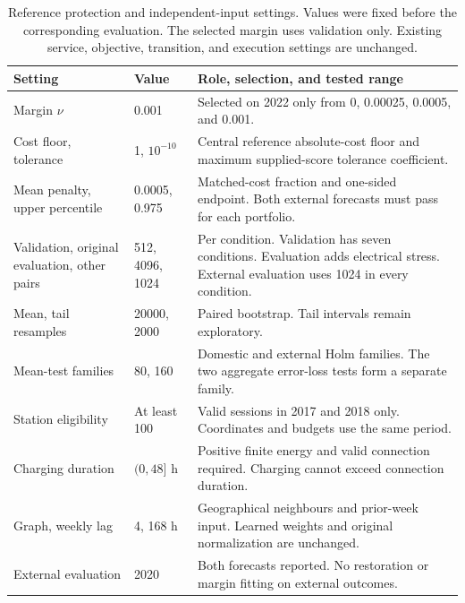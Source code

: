 \begin{table}[t]
\centering
\caption{Reference protection and independent-input settings. Values were fixed before the corresponding evaluation. The selected margin uses validation only. Existing service, objective, transition, and execution settings are unchanged.}
\label{tab:guarded-parameters}
\footnotesize\setlength{\tabcolsep}{3pt}\renewcommand{\arraystretch}{1.08}
\begin{tabular}{@{}p{}p{}p{}@{}}
\toprule
Setting & Value & Role, selection, and tested range \\
\midrule
Margin $\nu$ & 0.001 & Selected on 2022 only from 0, 0.00025, 0.0005, and 0.001. \\
Cost floor, tolerance & 1, $10^{-10}$ & Central reference absolute-cost floor and maximum supplied-score tolerance coefficient. \\
Mean penalty, upper percentile & 0.0005, 0.975 & Matched-cost fraction and one-sided endpoint. Both external forecasts must pass for each portfolio. \\
Validation, original evaluation, other pairs & 512, 4096, 1024 & Per condition. Validation has seven conditions. Evaluation adds electrical stress. External evaluation uses 1024 in every condition. \\
Mean, tail resamples & 20000, 2000 & Paired bootstrap. Tail intervals remain exploratory. \\
Mean-test families & 80, 160 & Domestic and external Holm families. The two aggregate error-loss tests form a separate family. \\
Station eligibility & At least 100 & Valid sessions in 2017 and 2018 only. Coordinates and budgets use the same period. \\
Charging duration & $(0,48]$ h & Positive finite energy and valid connection required. Charging cannot exceed connection duration. \\
Graph, weekly lag & 4, 168 h & Geographical neighbours and prior-week input. Learned weights and original normalization are unchanged. \\
External evaluation & 2020 & Both forecasts reported. No restoration or margin fitting on external outcomes. \\
\bottomrule
\end{tabular}
\end{table}
